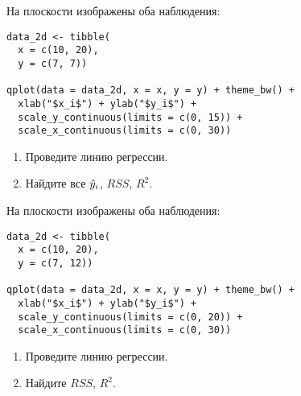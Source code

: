\begin{problem}
На плоскости изображены оба наблюдения:

\begin{verbatim}
data_2d <- tibble(
  x = c(10, 20),
  y = c(7, 7))

qplot(data = data_2d, x = x, y = y) + theme_bw() +
  xlab("$x_i$") + ylab("$y_i$") +
  scale_y_continuous(limits = c(0, 15)) +
  scale_x_continuous(limits = c(0, 30))
\end{verbatim}



\begin{minipage}{0.6\textwidth}
\begin{center}
\begin{tikzpicture}[scale = 0.025]

\end{tikzpicture}
\end{center}
\end{minipage}

\begin{enumerate}
\item Проведите линию регрессии.
\item Найдите все $\hy_i$, $RSS$, $R^2$.
\end{enumerate}

\begin{sol}
\end{sol}
\end{problem}

\begin{problem}
На плоскости изображены оба наблюдения:

\begin{verbatim}
data_2d <- tibble(
  x = c(10, 20),
  y = c(7, 12))

qplot(data = data_2d, x = x, y = y) + theme_bw() +
  xlab("$x_i$") + ylab("$y_i$") +
  scale_y_continuous(limits = c(0, 20)) +
  scale_x_continuous(limits = c(0, 30))
\end{verbatim}



\begin{minipage}{0.6\textwidth}
\begin{center}
\begin{tikzpicture}[scale = 0.025]

\end{tikzpicture}
\end{center}
\end{minipage}

\begin{enumerate}
\item Проведите линию регрессии.
\item Найдите $RSS$, $R^2$.
\end{enumerate}

\begin{sol}
\end{sol}
\end{problem}


